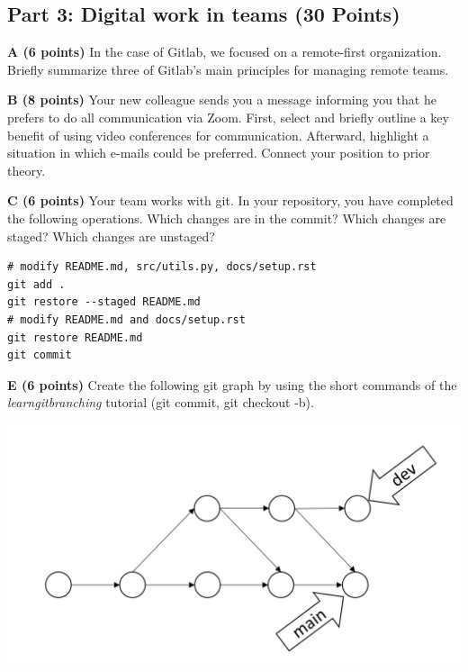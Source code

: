 \documentclass[12pt]{scrartcl}
\begin{document}
\vspace{0.3cm}

\subsection*{Part 3: Digital work in teams (30 Points)}

\textbf{A (6 points)} In the case of Gitlab, we focused on a remote-first organization. Briefly summarize three of Gitlab's main principles for managing remote teams.

\vspace{0.3cm}

\textbf{B (8 points)} Your new colleague sends you a message informing you that he prefers to do all communication via Zoom. First, select and briefly outline a key benefit of using video conferences for communication. Afterward, highlight a situation in which e-mails could be preferred. Connect your position to prior theory.

\vspace{0.3cm}

\textbf{C (6 points)} Your team works with git. In your repository, you have completed the following operations. Which changes are in the commit? Which changes are staged? Which changes are unstaged?

\begin{verbatim}
# modify README.md, src/utils.py, docs/setup.rst
git add .
git restore --staged README.md
# modify README.md and docs/setup.rst
git restore README.md
git commit
\end{verbatim}
\vspace{0.3cm}

\newpage

\textbf{E (6 points)} Create the following git graph by using the short commands of the \textit{learngitbranching} tutorial (git commit, git checkout -b).

\vspace{1cm}
\begin{center}
	\includegraphics[scale=0.6]{git-graph_2.png}
\end{center}
\end{document}
